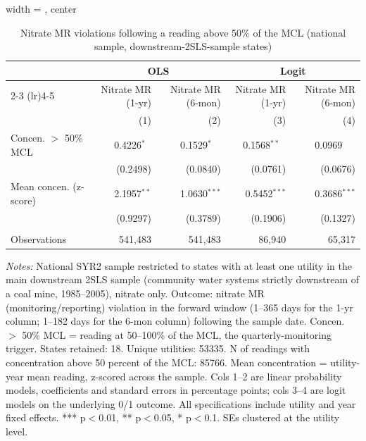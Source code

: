 
\begin{table}[htbp]
\caption{Nitrate MR violations following a reading above 50\% of the MCL (national sample, downstream-2SLS-sample states)}\label{tab:mr_concentration_lag_national_downstream_states}
\centering
\begin{adjustbox}{width = \textwidth, center}
   \begin{tabular}{lrrrr}
      \toprule    
       & \multicolumn{2}{c}{OLS} & \multicolumn{2}{c}{Logit} \\ \cmidrule(lr){2-3} \cmidrule(lr){4-5}
                      & Nitrate MR (1-yr) & Nitrate MR (6-mon)  & Nitrate MR (1-yr) & Nitrate MR (6-mon) \\   
                      & (1)               & (2)                 & (3)               & (4)\\  
      \midrule 
      Concen. $>$ 50\% MCL       & 0.4226$^{*\phantom{*}}$      & 0.1529$^{*\phantom{**}}$        & 0.1568$^{**\phantom{*}}$     & 0.0969$^{\phantom{***}}$\\   
                      & (0.2498)          & (0.0840)            & (0.0761)          & (0.0676)\\   
      Mean concen. (z-score)   & 2.1957$^{**}$     & 1.0630$^{***}$      & 0.5452$^{***}$    & 0.3686$^{***}$\\   
                      & (0.9297)          & (0.3789)            & (0.1906)          & (0.1327)\\   
       \\
      Observations    & 541,483           & 541,483             & 86,940            & 65,317\\  
      \bottomrule
   \end{tabular}
\end{adjustbox}
{\tiny\linespread{1}\selectfont \par \raggedright \textit{Notes:} National SYR2 sample restricted to states with at least one utility in the main downstream 2SLS sample (community water systems strictly downstream of a coal mine, 1985--2005), nitrate only. Outcome: nitrate MR (monitoring/reporting) violation in the forward window (1--365 days for the 1-yr column; 1--182 days for the 6-mon column) following the sample date. Concen. $>$ 50\% MCL = reading at 50--100\% of the MCL, the quarterly-monitoring trigger. States retained: 18. Unique utilities: 53335. N of readings with concentration above 50 percent of the MCL: 85766. Mean concentration = utility-year mean reading, z-scored across the sample. Cols 1--2 are linear probability models, coefficients and standard errors in percentage points; cols 3--4 are logit models on the underlying 0/1 outcome. All specifications include utility and year fixed effects. *** p$<$0.01, ** p$<$0.05, * p$<$0.1. SEs clustered at the utility level.}
\end{table}
